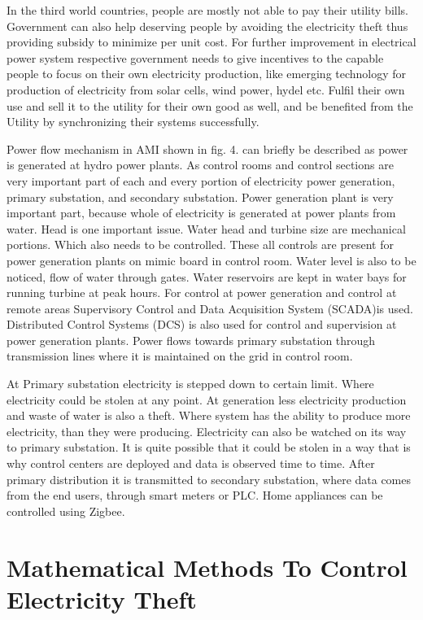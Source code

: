 \documentclass[10pt, conference, compsocconf]{IEEEtran}
\begin{document}
In the third world countries, people are mostly not able to pay their utility bills. Government can also help deserving people by avoiding the electricity theft thus providing subsidy to minimize per unit cost. For further improvement in electrical power system respective government needs to give incentives to the capable people to focus on their own electricity production, like emerging technology for production of electricity from solar cells, wind power, hydel etc. Fulfil their own use and sell it to the utility for their own good as well, and be benefited from the Utility by synchronizing their systems successfully.

Power flow mechanism in AMI shown in fig. 4. can briefly be described as power is generated at hydro power plants. As control rooms and control sections are very important part of each and every portion of electricity power generation, primary substation, and secondary substation. Power generation plant is very important part, because whole of electricity is generated at power plants from water. Head is one important issue. Water head and turbine size are mechanical portions. Which also needs to be controlled. These all controls are present for power generation plants on mimic board in control room. Water level is also to be noticed, flow of water through gates. Water reservoirs are kept in water bays for running turbine at peak hours. For control at power generation and control at remote areas Supervisory Control and Data Acquisition System (SCADA)is used. Distributed Control Systems (DCS) is also used for control and supervision at power generation plants. Power flows towards primary substation through transmission lines where it is maintained on the grid in control room.

At Primary substation electricity is stepped down to certain limit. Where electricity could be stolen at any point. At generation less electricity production and waste of water is also a theft. Where system has the ability to produce more electricity, than they were producing. Electricity can also be watched on its way to primary substation. It is quite possible that it could be stolen in a way that is why control centers are deployed and data is observed time to time. After primary distribution it is transmitted to secondary substation, where data comes from the end users, through smart meters or PLC. Home appliances can be controlled using Zigbee.

\section{Mathematical Methods To Control Electricity Theft}
\end{document}
